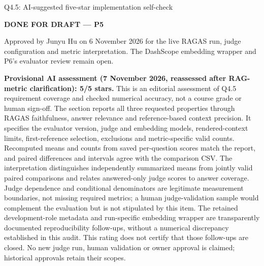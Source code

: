 \begin{review}{Q4.5: AI-suggested five-star implementation self-check}
\colorbox{yellow!45}{\strut\textbf{DONE FOR DRAFT --- P5}}\par
Approved by Junyu Hu on 6 November 2026 for the live RAGAS run, judge configuration and metric interpretation. The DashScope embedding wrapper and P6's evaluator review remain open.\par\smallskip
{}\quad\textbf{Provisional AI assessment (7 November 2026, reassessed after RAG-metric clarification): 5/5 stars.} This is an editorial assessment of Q4.5 requirement coverage and checked numerical accuracy, not a course grade or human sign-off. The section reports all three requested properties through RAGAS faithfulness, answer relevance and reference-based context precision. It specifies the evaluator version, judge and embedding models, rendered-context limits, first-reference selection, exclusions and metric-specific valid counts. Recomputed means and counts from saved per-question scores match the report, and paired differences and intervals agree with the comparison CSV. The interpretation distinguishes independently summarized means from jointly valid paired comparisons and relates answered-only judge scores to answer coverage. Judge dependence and conditional denominators are legitimate measurement boundaries, not missing required metrics; a human judge-validation sample would complement the evaluation but is not stipulated by this item. The retained development-role metadata and run-specific embedding wrapper are transparently documented reproducibility follow-ups, without a numerical discrepancy established in this audit. This rating does not certify that those follow-ups are closed. No new judge run, human validation or owner approval is claimed; historical approvals retain their scopes.
\end{review}
